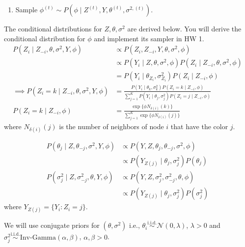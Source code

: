 \documentclass[11pt]{article}
\newcommand{\iid}{\stackrel{\text{i.i.d.}}{\sim}}
\begin{document}
\begin{enumerate}
\begin{enumerate}
\begin{enumerate}[label=(\arabic*)]
\begin{enumerate}[label=(\roman*)]
	\item Sample $\phi^{(t)} \sim P(\phi \mid Z^{(t)}, Y, \theta^{(t)}, \sigma^{2, (t)})$.
\end{enumerate}
\end{enumerate}

The conditional distributions for $Z, \theta, \sigma^2$ are derived below. You will derive the conditional distribution for $\phi$ and implement its sampler in HW 1.
\begin{align*}
	P(Z_i \mid Z_{-i}, \theta, \sigma^2, Y, \phi) &\propto P(Z_i, Z_{-i}, Y, \theta, \sigma^2, \phi) \\
	&\propto P(Y_i \mid Z, \theta, \sigma^2, \phi) P(Z_i \mid Z_{-i}, \theta, \sigma^2, \phi) \\
	&= P(Y_i \mid \theta_{Z_i}, \sigma_{Z_i}^2) P(Z_i \mid Z_{-i}, \phi) \\
	\implies P(Z_i = k \mid Z_{-i}, \theta, \sigma^2, Y, \phi) &= \frac{P(Y_i \mid \theta_{k}, \sigma_{k}^2) P(Z_i = k \mid Z_{-i}, \phi)}{\sum_{j=1}^K P(Y_i \mid \theta_{j}, \sigma_{j}^2) P(Z_i = j \mid Z_{-i}, \phi)} \\
	P(Z_i = k \mid Z_{-i}, \phi) &= \frac{\exp\{ \phi N_{\delta(i)}(k)\}}{\sum_{j=1}^K \exp\{ \phi N_{\delta(i)}(j)\}}
\end{align*}
where $N_{\delta(i)}(j)$ is the number of neighbors of node $i$ that have the color $j$.

\begin{align*}
	P(\theta_j \mid Z, \theta_{-j}, \sigma^2, Y, \phi) &\propto P(Y, Z, \theta_j, \theta_{-j}, \sigma^2, \phi) \\
	&\propto P(Y_{Z(j)} \mid \theta_j, \sigma_j^2) P(\theta_j) \\
	P(\sigma_j^2 \mid Z, \sigma^2_{-j}, \theta, Y, \phi) &\propto P(Y, Z, \sigma^2_j, \sigma^2_{-j}, \theta, \phi) \\
	&\propto P(Y_{Z(j)} \mid \theta_j, \sigma_j^2) P(\sigma_j^2)
\end{align*}
where $Y_{Z(j)} = \{ Y_i : Z_i = j\}$.

We will use conjugate priors for $(\theta, \sigma^2)$ i.e., $\theta_i \iid \mathcal{N}(0, \lambda)$, $\lambda > 0$ and $\sigma_j^2 \iid \text{Inv-Gamma}(\alpha, \beta)$, $\alpha, \beta > 0$.



\end{enumerate}




\end{enumerate}
\end{document}
